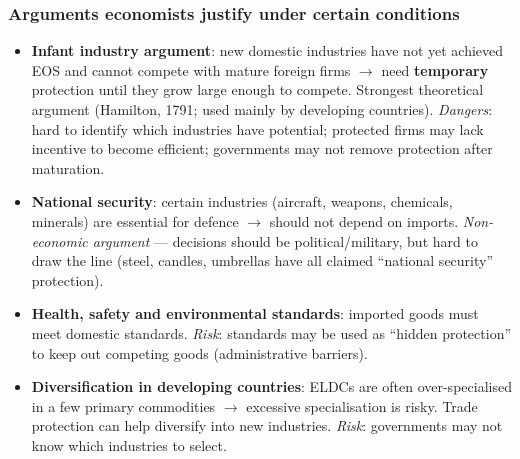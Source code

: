 \subsubsection*{Arguments economists justify under certain conditions}
\begin{itemize}
  \item \textbf{Infant industry argument}: new domestic industries have not yet achieved EOS and cannot compete with mature foreign firms $\to$ need \textbf{temporary} protection until they grow large enough to compete. Strongest theoretical argument (Hamilton, 1791; used mainly by developing countries). \textit{Dangers}: hard to identify which industries have potential; protected firms may lack incentive to become efficient; governments may not remove protection after maturation.
  \item \textbf{National security}: certain industries (aircraft, weapons, chemicals, minerals) are essential for defence $\to$ should not depend on imports. \textit{Non-economic argument} --- decisions should be political/military, but hard to draw the line (steel, candles, umbrellas have all claimed ``national security'' protection).
  \item \textbf{Health, safety and environmental standards}: imported goods must meet domestic standards. \textit{Risk}: standards may be used as ``hidden protection'' to keep out competing goods (administrative barriers).
  \item \textbf{Diversification in developing countries}: ELDCs are often over-specialised in a few primary commodities $\to$ excessive specialisation is risky. Trade protection can help diversify into new industries. \textit{Risk}: governments may not know which industries to select.
\end{itemize}
